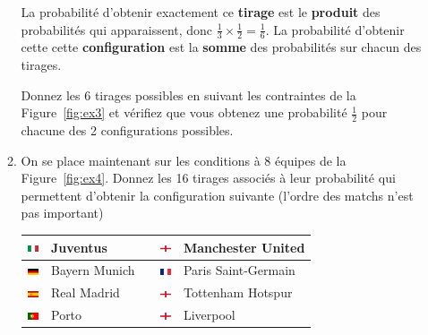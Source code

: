 \documentclass{../ficheTDTP}
\begin{document}
\begin{enumerate}
\begin{enumerate}
La probabilité d'obtenir exactement ce \textbf{tirage} est le \textbf{produit} des probabilités qui apparaissent, donc $\frac{1}{3} \times \frac{1}{2} = \frac{1}{6}$. 
La probabilité d'obtenir cette cette \textbf{configuration} est la \textbf{somme} des probabilités sur chacun des tirages.

Donnez les 6 tirages possibles en suivant les contraintes de la Figure~\ref{fig:ex3} et vérifiez que vous obtenez une probabilité $\frac{1}{2}$ pour chacune des 2 configurations possibles.

\item On se place maintenant sur les conditions à 8 équipes de la Figure~\ref{fig:ex4}. Donnez les 16 tirages associés à leur probabilité qui permettent d'obtenir la configuration suivante (l'ordre des matchs n'est pas important)

\begin{tabular}{|clccl|}
\hline
\includegraphics[height=0.2cm]{flags/it.png} & Juventus & & \includegraphics[height=0.2cm]{flags/en.png} & Manchester United \\ \hline
\includegraphics[height=0.2cm]{flags/de.png} & Bayern Munich & & \includegraphics[height=0.2cm]{flags/fr.png} & Paris Saint-Germain \\ \hline
\includegraphics[height=0.2cm]{flags/es.png} & Real Madrid & & \includegraphics[height=0.2cm]{flags/en.png} & Tottenham Hotspur \\ \hline
\includegraphics[height=0.2cm]{flags/po.png} & Porto & & \includegraphics[height=0.2cm]{flags/en.png} & Liverpool \\ \hline
\end{tabular}


\end{enumerate}
\end{enumerate}
\end{document}
